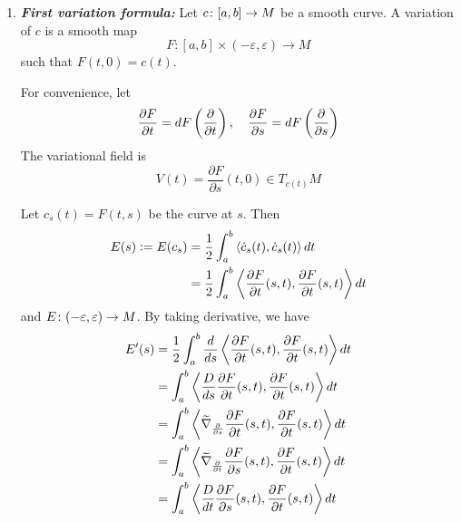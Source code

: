 \begin{enumerate}[label=\arabic{*}.]
	\item \emph{\textbf{First variation formula:}} Let $c \colon [a,b] \rightarrow M$ be a smooth curve. A variation of $c$ is a smooth map
	\begin{equation*}
		F \colon [a,b] \times (-\varepsilon,\varepsilon) \longrightarrow M
	\end{equation*}
	such that $F(t,0) = c(t)$.
	\begin{rmk}
		For convenience, let
		\begin{equation*}
			\frac{\partial F}{\partial t} = dF\left(\frac{\partial }{\partial t}\right),\quad \frac{\partial F}{\partial s} = dF\left(\frac{\partial }{\partial s}\right)
		\end{equation*}
		The variational field is
		\begin{equation*}
			V(t) = \frac{\partial F}{\partial s}(t,0) \in T_{c(t)}M
		\end{equation*}
	\end{rmk}
	Let $c_s(t) = F(t,s)$ be the curve at $s$. Then
	\begin{equation*}
		\begin{aligned}
			E(s) \vcentcolon= E(c_s) &= \frac{1}{2}\int_a^b \left\langle \dot{c}_s(t),\dot{c}_s(t) \right\rangle dt \\
			&=  \frac{1}{2}\int_a^b \left\langle \frac{\partial F}{\partial t}(s,t),\frac{\partial F}{\partial t}(s,t) \right\rangle dt
		\end{aligned}
	\end{equation*}
	and $E \colon (-\varepsilon,\varepsilon) \rightarrow M$. By taking derivative, we have 
	\begin{equation*}
		\begin{aligned}
			E^\prime(s) &= \frac{1}{2}\int_a^b \frac{d}{ds}\inn{\frac{\partial F}{\partial t}(s,t),\frac{\partial F}{\partial t}(s,t)} dt \\
			&= \int_a^b \inn{\frac{D}{ds}\frac{\partial F}{\partial t}(s,t),\frac{\partial F}{\partial t}(s,t)} dt \\
			&= \int_a^b \inn{\widetilde{\nabla}_{\frac{\partial}{\partial s}}\frac{\partial F}{\partial t}(s,t),\frac{\partial F}{\partial t}(s,t)} dt \\
			&= \int_a^b \inn{\widetilde{\nabla}_{\frac{\partial}{\partial t}}\frac{\partial F}{\partial s}(s,t),\frac{\partial F}{\partial t}(s,t)} dt \\
			&= \int_a^b \inn{\frac{D}{dt}\frac{\partial F}{\partial s}(s,t),\frac{\partial F}{\partial t}(s,t)} dt \\

\end{aligned}
\end{equation*}
\end{enumerate}
